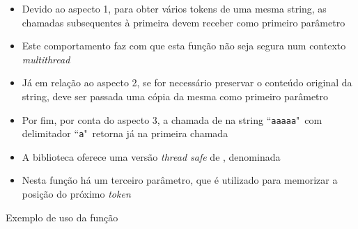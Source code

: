 \begin{frame}[fragile]{}

    \begin{itemize}
        \item Devido ao aspecto 1, para obter vários tokens de uma mesma string, as chamadas 
            subsequentes à primeira devem receber  como primeiro parâmetro
        \pause

        \item Este comportamento faz com que esta função não seja segura num contexto \textit{multithread}
        \pause

        \item Já em relação ao aspecto 2, se for necessário preservar o conteúdo original da string, deve ser passada uma cópia da mesma como primeiro parâmetro
        \pause

        \item Por fim, por conta do aspecto 3, a chamada de  na string
            ``\texttt{aaaaa}"\ com delimitador ``\texttt{a}"\ retorna  já na 
            primeira chamada
        \pause

        \item A biblioteca  oferece uma versão \textit{thread safe} de , denominada 
        \pause

        \item Nesta função há um terceiro parâmetro, que é utilizado para memorizar a posição do próximo \textit{token}
    \end{itemize}

\end{frame}

\begin{frame}[fragile]{Exemplo de uso da função }
\end{frame}


